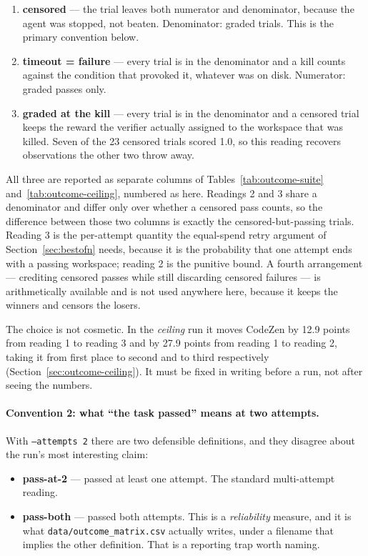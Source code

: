 \documentclass[11pt,a4paper]{article}
\newcommand{\code}[1]{\texttt{\small #1}}
\begin{document}
\begin{enumerate}[label=\textbf{\arabic*.}]
\item \textbf{censored} --- the trial leaves both numerator and denominator, because the agent
      was stopped, not beaten. Denominator: graded trials. This is the primary convention
      below.
\item \textbf{timeout = failure} --- every trial is in the denominator and a kill counts
      against the condition that provoked it, whatever was on disk. Numerator: graded passes
      only.
\item \textbf{graded at the kill} --- every trial is in the denominator and a censored trial
      keeps the reward the verifier actually assigned to the workspace that was killed. Seven
      of the 23 censored trials scored 1.0, so this reading recovers observations the other
      two throw away.
\end{enumerate}

\noindent All three are reported as separate columns of
Tables~\ref{tab:outcome-suite} and~\ref{tab:outcome-ceiling}, numbered as here. Readings 2
and 3 share a denominator and differ only over whether a censored pass counts, so the
difference between those two columns is exactly the censored-but-passing trials. Reading 3 is
the per-attempt quantity the equal-spend retry argument of Section~\ref{sec:bestofn} needs,
because it is the probability that one attempt ends with a passing workspace; reading 2 is the
punitive bound. A fourth arrangement --- crediting censored passes while still discarding
censored failures --- is arithmetically available and is not used anywhere here, because it
keeps the winners and censors the losers.

The choice is not cosmetic. In the \emph{ceiling} run it moves CodeZen by 12.9 points from
reading 1 to reading 3 and by 27.9 points from reading 1 to reading 2, taking it from first
place to second and to third respectively (Section~\ref{sec:outcome-ceiling}). It must be fixed in
writing before a run, not after seeing the numbers.

\paragraph{Convention 2: what ``the task passed'' means at two attempts.} With
\code{--attempts 2} there are two defensible definitions, and they disagree about the run's
most interesting claim:

\begin{itemize}
\item \textbf{pass-at-2} --- passed at least one attempt. The standard multi-attempt reading.
\item \textbf{pass-both} --- passed both attempts. This is a \emph{reliability} measure, and
      it is what \code{data/outcome\_matrix.csv} actually writes, under a filename that
      implies the other definition. That is a reporting trap worth naming.
\end{itemize}
\end{document}
